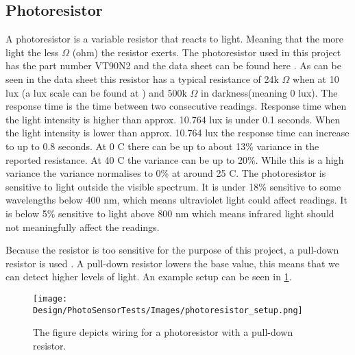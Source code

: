 \subsection{Photoresistor}
A photoresistor is a variable resistor that reacts to light. Meaning that the more light the less $\Omega$ (ohm) the resistor exerts. The photoresistor used in this project has the part number VT90N2 and the data sheet can be found here \cite{photoresistor_sheet}. As can be seen in the data sheet this resistor has a typical resistance of 24k $\Omega$ when at 10 lux (a lux scale can be found at \cite{lux_scale}) and 500k $\Omega$ in darkness(meaning 0 lux). The response time is the time between two consecutive readings. Response time when the light intensity is higher than approx. 10.764 lux is under 0.1 seconds. When the light intensity is lower than approx. 10.764 lux the response time can increase to up to 0.8 seconds. At 0 \degree C there can be up to about 13\% variance in the reported resistance. At 40 \degree C the variance can be up to 20\%. While this is a high variance the variance normalises to 0\% at around 25 \degree C. The photoresistor is sensitive to light outside the visible spectrum. It is under 18\% sensitive to some wavelengths below 400 nm, which means ultraviolet light could affect readings. It is below 5\% sensitive to light above 800 nm which means infrared light should not meaningfully affect the readings.

Because the resistor is too sensitive for the purpose of this project, a pull-down resistor is used \cite{pulldown_resistor}. A pull-down resistor lowers the base value, this means that we can detect higher levels of light. An example setup can be seen in \cref{fig:arduino_photoresistor_wiring}.

\begin{figure}[htbp]
  \centering
  \texttt{[image: Design/PhotoSensorTests/Images/photoresistor\_setup.png]}
  \caption{The figure depicts wiring for a photoresistor with a pull-down resistor.}\label{fig:arduino_photoresistor_wiring}
\end{figure}

